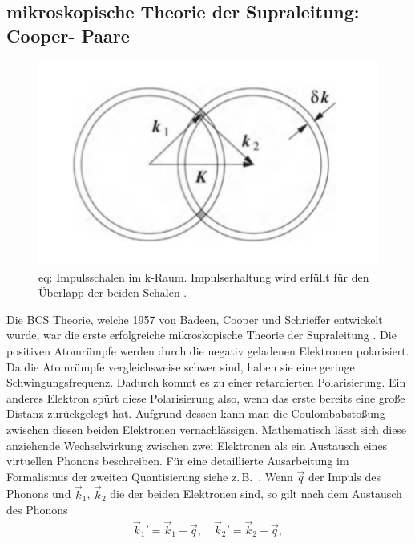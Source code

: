 \documentclass[twoside,        %
               BCOR12mm,       %
               english,ngerman, %
               fleqn,headsepline=false,footsepline=false
              ]{Vorlage/MFPREPORT}
\newcommand{\zB}{z.\,B.\ }
\begin{document}
\subsection{mikroskopische Theorie der Supraleitung: Cooper- Paare}
\begin{figure}[]
    \begin{center}
        \includegraphics[scale=0.7]{fig/kreis.png}
    \end{center}
    \caption{eq: Impulsschalen im k-Raum. Impulserhaltung wird erfüllt für den
    Überlapp der beiden Schalen \cite[S.]{enss2011tieftemperaturphysik}.}
    \label{fig:kreis}
\end{figure}
Die BCS Theorie, welche 1957 von Badeen, Cooper und Schrieffer entwickelt
wurde, war die erste erfolgreiche mikroskopische Theorie der Supraleitung
\cite[Kap.]{buckel2013supraleitung}. Die positiven Atomrümpfe werden durch die
negativ geladenen Elektronen polarisiert. Da die Atomrümpfe vergleichsweise
schwer sind, haben sie eine geringe Schwingungsfrequenz. Dadurch kommt es zu
einer retardierten Polarisierung. Ein anderes Elektron spürt diese
Polarisierung also, wenn das erste bereits eine große Distanz zurückgelegt hat.
Aufgrund dessen kann man die Coulombabstoßung zwischen diesen beiden Elektronen
vernachlässigen. Mathematisch lässt sich diese anziehende Wechselwirkung
zwischen zwei Elektronen als ein Austausch eines virtuellen Phonons
beschreiben. Für eine detaillierte Ausarbeitung im Formalismus der zweiten
Quantisierung siehe \zB \cite[Kap.]{enss2011tieftemperaturphysik}.
Wenn $\vec q$ der Impuls des Phonons und $\vec k_1$, $\vec k_2$ die der beiden Elektronen
sind, so gilt nach dem Austausch des Phonons
\cite[S.]{enss2011tieftemperaturphysik}
\begin{align}
    \label{eq:phononimp}
    \vec k_1'=\vec k_1 +\vec q, \quad \vec k_2'=\vec k_2 -\vec q,
\end{align}
\end{document}
